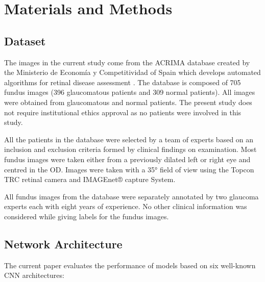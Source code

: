 \documentclass{article}
\begin{document}
\section{Materials and Methods}

\subsection{Dataset}
The images in the current study come from the ACRIMA database created by the Ministerio de Economía y Competitividad of Spain which develops automated algorithms for retinal disease assessment \cite{b15}. The database is composed of 705 fundus images (396 glaucomatous patients and 309 normal patients). All images were obtained from glaucomatous and normal patients. The present study does not require institutional ethics approval as no patients were involved in this study.

All the patients in the database were selected by a team of experts based on an inclusion and exclusion criteria formed by clinical findings on examination. Most fundus images were taken either from a previously dilated left or right eye and centred in the OD. Images were taken with a 35° field of view using the Topcon TRC retinal camera and IMAGEnet® capture System.

All fundus images from the database were separately annotated by two glaucoma experts each with eight years of experience. No other clinical information was considered while giving labels for the fundus images.

\subsection{Network Architecture}
The current paper evaluates the performance of models based on six well-known CNN architectures:
\end{document}

